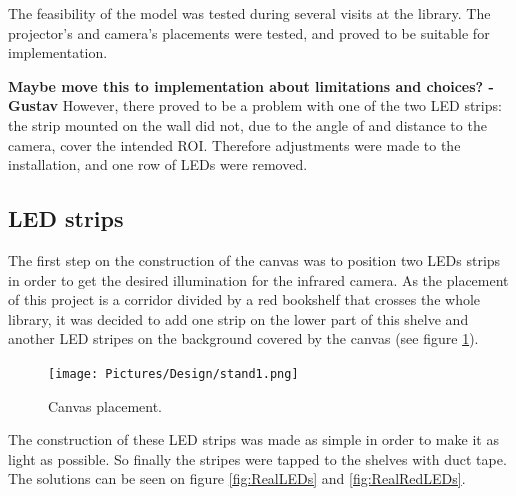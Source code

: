 The feasibility of the model was tested during several visits at the library. The projector's and camera's placements were tested, and proved to be suitable for implementation.

\textbf{Maybe move this to implementation about limitations and choices? - Gustav}
However, there proved to be a problem with one of the two LED strips: the strip mounted on the wall did not, due to the angle of and distance to the camera, cover the intended ROI. Therefore adjustments were made to the installation, and one row of LEDs were removed.

\subsection{LED strips}
The first step on the construction of the canvas was to position two LEDs strips in order to get the desired illumination for the infrared camera. As the placement of this project is a corridor divided by a red bookshelf that crosses the whole library, it was decided to add one strip on the lower part of this shelve and another LED stripes on the background covered by the canvas (see figure \ref{fig:LEDsPosition}).

\begin{figure}[htbp] 
\centering 
\texttt{[image: Pictures/Design/stand1.png]} 
\caption{Canvas placement.}
\label{fig:LEDsPosition} 
\end{figure}

The construction of these LED strips was made as simple in order to make it as light as possible. So finally the stripes were tapped to the shelves with duct tape. The solutions can be seen on figure \ref{fig:RealLEDs} and \ref{fig:RealRedLEDs}.

